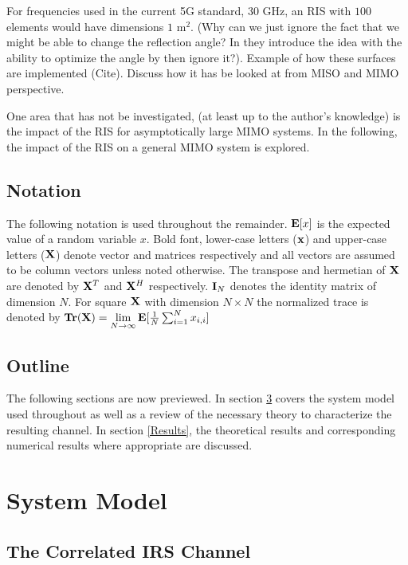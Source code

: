 \documentclass[12pt,a4paper]{report}
\begin{document}
For frequencies used in the current 5G standard, 30 GHz, an RIS with $100$ elements would have dimensions $1$ $\text{m}^2$.
(Why can we just ignore the fact that we might be able to change the reflection angle? In \cite{basar2019wireless} they introduce the idea with the ability to optimize the angle by then ignore it?).
Example of how these surfaces are implemented (Cite).
Discuss how it has be looked at from MISO and MIMO perspective.
\par
One area that has not be investigated, (at least up to the author's knowledge) is the impact of the RIS for 
asymptotically large MIMO systems. In the following, the impact of the RIS on a general MIMO system is explored. 

\section{Notation}
The following notation is used throughout the remainder. 
$\mathop{\bf E{}}[x]$ is the expected value of a random variable $x$.
Bold font, lower-case letters ($\mathbf{x}$) and upper-case letters ($\mathbf{X}$) denote vector and matrices respectively and all vectors are assumed to be column vectors unless noted otherwise. 
The transpose and hermetian of $\mathbf{X}$ are denoted by $\mathbf{X}^T$ and $\mathbf{X}^H$ respectively.
$\mathbf{I}_N$ denotes the identity matrix of dimension $N$.
For square $\mathbf{X}$ with dimension $N\times N$ the normalized trace is denoted by $\mathop{\bf Tr}(\mathbf{X})  = \underset{N \rightarrow \infty}{\text{lim}}
\mathop{\bf E{}}[\frac{1}{N}\sum_{i=1}^N x_{i,i}]$

\section{Outline}
The following sections are now previewed. In section \ref{system_model} covers the system model used throughout as well as a review of the necessary theory to characterize the resulting channel. In section \ref{Results}, the theoretical results and corresponding numerical results where appropriate are discussed. 

\chapter{System Model}\label{system_model}
\section{The Correlated IRS Channel}
\end{document}
